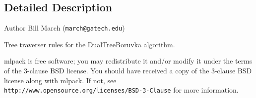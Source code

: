 \subsection{Detailed Description}
\begin{DoxyAuthor}{Author}
Bill March ({\tt march@gatech.\+edu})
\end{DoxyAuthor}
Tree traverser rules for the Dual\+Tree\+Boruvka algorithm.

mlpack is free software; you may redistribute it and/or modify it under the terms of the 3-\/clause B\+SD license. You should have received a copy of the 3-\/clause B\+SD license along with mlpack. If not, see {\tt http\+://www.\+opensource.\+org/licenses/\+B\+S\+D-\/3-\/\+Clause} for more information. 